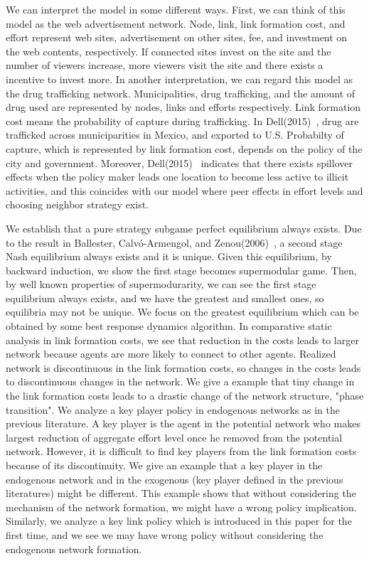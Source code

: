 \documentclass[12pt]{article}
\theoremstyle{definition}
\begin{document}
We can interpret the model in some different ways.
First, we can think of this model as the web advertisement network.
Node, link, link formation cost, and effort represent web sites, advertisement on other sites, fee, and investment on the web contents, respectively.
If connected sites invest on the site and the number of viewers increase, more viewers visit the site and there exists a incentive to invest more.
In another interpretation, we can regard this model as the drug trafficking network.
Municipalities, drug trafficking, and the amount of drug used are represented by nodes, links and efforts respectively.
Link formation cost means the probability of capture during trafficking.
In Dell(2015)~\cite{Dell}, drug are trafficked across municiparities in Mexico, and exported to U.S.
Probabilty of capture, which is represented by  link formation cost, depends on the policy of the city and government.
Moreover, Dell(2015)~\cite{Dell} indicates that there exists spillover effects when the policy maker leads one location to become less active to illicit activities, and this coincides with our model where peer effects in effort levels and choosing neighbor strategy exist.

We establish that a pure strategy subgame perfect equilibrium always exists.
Due to the result in Ballester, Calv\'{o}-Armengol, and Zenou(2006)~\cite{whowho}, a second stage Nash equilibrium always exists and it is unique.
Given this equilibrium, by backward induction, we show the first stage becomes supermodular game.
Then, by well known properties of supermodurarity, we can see the first stage equilibrium always exists, and we have the greatest and smallest ones, so equilibria may not be unique.
We focus on the greatest equilibrium which can be obtained by some best response dynamics algorithm.
In comparative static analysis in link formation costs, we see that reduction in the costs leads to larger network because agents are more likely to connect to other agents.
Realized network is discontinuous in the link formation costs, so changes in the costs leads to discontinuous changes in the network.
We give a example that tiny change in the link formation costs leads to a drastic change of the network structure, "phase transition".
We analyze a key player policy in endogenous networks as in the previous literature.
A key player is the agent in the potential network who makes largest reduction of aggregate effort level once he removed from the potential network.
However, it is difficult to find key players from the link formation costs because of its discontinuity.
We give an example that a key player in the endogenous network and in the exogenous (key player defined in the previous literatures) might be different.
This example shows that without considering the mechanism of the network formation, we might have a wrong policy implication.
Similarly, we analyze a key link policy which is introduced in this paper for the first time, and we see we may have wrong policy without considering the endogenous network formation.
\end{document}
